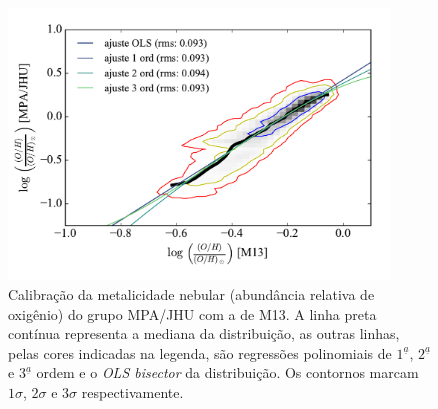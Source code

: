 \begin{figure}
	\centering
	\includegraphics[width=0.9\textwidth]{figuras/logOH_ZnebMPA.pdf}
	\caption[Calibração das metalicidades.]
	{Calibração da metalicidade nebular (abundância relativa de oxigênio) do grupo MPA/JHU com a de
M13. A linha preta contínua representa a mediana da distribuição, as outras linhas, pelas cores
indicadas na legenda, são regressões polinomiais de $1^\underline{a}$, $2^\underline{a}$ e
$3^\underline{a}$ ordem e o {\em OLS bisector} da distribuição. Os contornos marcam $1\sigma$,
$2\sigma$ e $3\sigma$ respectivamente.}
	\label{fig:calibZ}
\end{figure}


